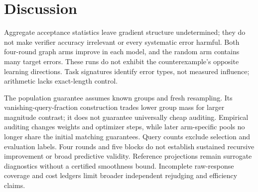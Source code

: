 \section{Discussion}
\label{sec:discussion}

Aggregate acceptance statistics leave gradient structure undetermined;
they do not make verifier accuracy irrelevant or every systematic error
harmful. Both four-round graph arms improve in each model, and the random arm contains many target
errors. These runs do not exhibit the counterexample's opposite learning
directions. Task signatures identify error
types, not measured influence; arithmetic lacks exact-length control.

The population guarantee assumes known groups and fresh resampling.
Its vanishing-query-fraction construction trades lower group mass for
larger magnitude contrast; it does not guarantee universally cheap auditing.
Empirical auditing changes weights and optimizer steps, while later
arm-specific pools no longer share the initial matching guarantees.
Query counts exclude selection and evaluation labels. Four rounds and five
blocks do not establish sustained recursive improvement or broad predictive
validity. Reference projections remain surrogate diagnostics without a
certified smoothness bound. Incomplete raw-response coverage and cost ledgers
limit broader independent rejudging and efficiency claims.
